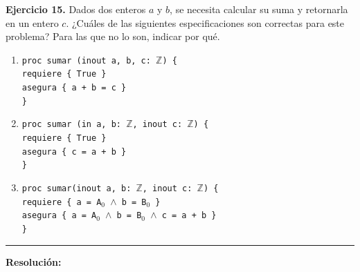 \hypertarget{ej15}{}
\noindent \textbf{Ejercicio 15.} Dados dos enteros $a$ y $b$, se necesita calcular su suma y retornarla en un entero $c$. ¿Cuáles de las siguientes especificaciones son correctas para este problema? Para las que no lo son, indicar por qué.

\begin{enumerate}[label=\alph*)]
    \item \texttt{proc sumar (inout a, b, c: $\mathbb{Z}$) \{} \\
    \texttt{\hspace*{0.5cm}requiere \{ True \}} \\
    \texttt{\hspace*{0.5cm}asegura \{ a + b = c \}} \\
    \texttt{\}}

    \item \texttt{proc sumar (in a, b: $\mathbb{Z}$, inout c: $\mathbb{Z}$) \{} \\
    \texttt{\hspace*{0.5cm}requiere \{ True \}} \\
    \texttt{\hspace*{0.5cm}asegura \{ c = a + b \}} \\
    \texttt{\}}

    \newpage

    \item \texttt{proc sumar(inout a, b: $\mathbb{Z}$, inout c: $\mathbb{Z}$) \{} \\
    \texttt{\hspace*{0.5cm}requiere \{ a = A$_0$ $\wedge$ b = B$_0$ \}} \\
    \texttt{\hspace*{0.5cm}asegura \{ a = A$_0$ $\wedge$ b = B$_0$ $\wedge$ c = a + b \}} \\
    \texttt{\}}
\end{enumerate}

\vspace{0.2cm}
{\color{gray}\hrule}
\vspace{0.4cm}

\textbf{Resolución:}

